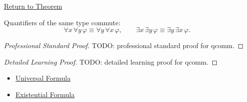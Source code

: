\newpage
{}
\label{prf:qcomm}

\begin{remark*}[Return]
\hyperref[thm:qcomm]{Return to Theorem}
\end{remark*}

\begin{theorem*}
Quantifiers of the same type commute:
\[
\forall x\,\forall y\,\varphi \equiv \forall y\,\forall x\,\varphi,
\qquad
\exists x\,\exists y\,\varphi \equiv \exists y\,\exists x\,\varphi.
\]
\end{theorem*}

\begin{proof}[Professional Standard Proof]
\LRAProofBodyStart
TODO: professional standard proof for qcomm.
\end{proof}

\begin{proof}[Detailed Learning Proof]
\LRAProofBodyStart
TODO: detailed learning proof for qcomm.
\end{proof}

\begin{remark*}
\end{remark*}

\begin{dependencies}
\begin{itemize}
  \item \hyperref[def:universal-q]{Universal Formula}
  \item \hyperref[def:existential-q]{Existential Formula}
\end{itemize}
\end{dependencies}

\clearpage
